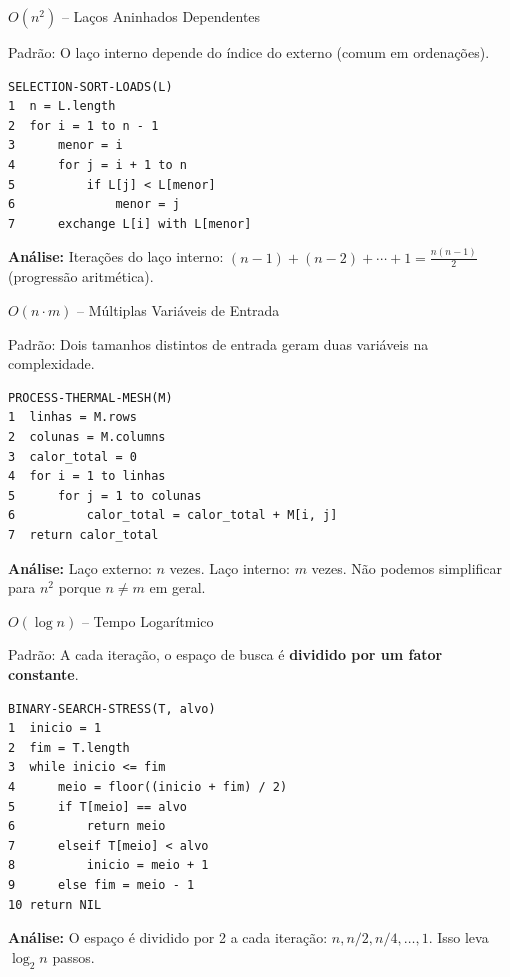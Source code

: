 \documentclass[aspectratio=169]{beamer}
\begin{document}
\begin{frame}{$O(n^2)$ -- Laços Aninhados Dependentes}
    \begin{block}{Padrão: O laço interno depende do índice do externo (comum em ordenações).}
    \end{block}
\begin{verbatim}
SELECTION-SORT-LOADS(L)
1  n = L.length
2  for i = 1 to n - 1
3      menor = i
4      for j = i + 1 to n
5          if L[j] < L[menor]
6              menor = j
7      exchange L[i] with L[menor]
\end{verbatim}
    \textbf{Análise:} Iterações do laço interno: $(n{-}1) + (n{-}2) + \cdots + 1 = \frac{n(n{-}1)}{2}$ (progressão aritmética).
    
    \vspace{0.2cm}
    \hfill{}
\end{frame}

\begin{frame}{$O(n \cdot m)$ -- Múltiplas Variáveis de Entrada}
    \begin{block}{Padrão: Dois tamanhos distintos de entrada geram duas variáveis na complexidade.}
    \end{block}
\begin{verbatim}
PROCESS-THERMAL-MESH(M)
1  linhas = M.rows
2  colunas = M.columns
3  calor_total = 0
4  for i = 1 to linhas
5      for j = 1 to colunas
6          calor_total = calor_total + M[i, j]
7  return calor_total
\end{verbatim}
    \textbf{Análise:} Laço externo: $n$ vezes. Laço interno: $m$ vezes. Não podemos simplificar para $n^2$ porque $n \ne m$ em geral.
    
    \vspace{0.2cm}
    \hfill{}
\end{frame}

\begin{frame}{$O(\log n)$ -- Tempo Logarítmico}
    \begin{block}{Padrão: A cada iteração, o espaço de busca é \textbf{dividido por um fator constante}.}
    \end{block}
\begin{verbatim}
BINARY-SEARCH-STRESS(T, alvo)
1  inicio = 1
2  fim = T.length
3  while inicio <= fim
4      meio = floor((inicio + fim) / 2)
5      if T[meio] == alvo
6          return meio
7      elseif T[meio] < alvo
8          inicio = meio + 1
9      else fim = meio - 1
10 return NIL
\end{verbatim}
    \textbf{Análise:} O espaço é dividido por 2 a cada iteração: $n, n/2, n/4, \ldots, 1$. Isso leva $\log_2 n$ passos.
    
    \vspace{0.2cm}
    \hfill{}
\end{frame}
\end{document}
